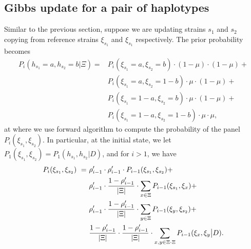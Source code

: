 \subsection{Gibbs update for a pair of haplotypes}
Similar to the previous section, suppose we are updating strains $s_1$ and $s_2$ copying from reference strains $\xi_{s_1}$ and $\xi_{s_1}$ respectively. The prior probability  becomes
\begin{equation}
\begin{split}
P_i \left( h_{s_1} = a, h_{s_2} = b | \Xi \right) = & P_i\left( \xi_{s_1} = a, \xi_{s_2} = b \right) \cdot (1-\mu)\cdot(1-\mu)  + \\
                                                    & P_i\left( \xi_{s_1} = a, \xi_{s_2} = 1-b \right) \cdot  \mu\cdot(1-\mu)  + \\
                                                    & P_i\left( \xi_{s_1} = 1-a, \xi_{s_2} = b \right) \cdot  \mu\cdot(1-\mu)  + \\
                                                    & P_i\left( \xi_{s_1} = 1-a, \xi_{s_2} = 1-b \right) \cdot \mu \cdot \mu,
\end{split}\label{eqn:llk_given_D:two}
\end{equation}
at where we use forward algorithm to compute the probability of the panel $P_i(\xi_{s_1}, \xi_{s_2})$. In particular, at the initial state, we let $P_1(\xi_{s_1}, \xi_{s_2}) = P_1(h_{s_1}, h_{s_2}|D)$, and for $i>1$, we have
\begin{equation}
\begin{split}
P_{i}(\xi_{s_1}, \xi_{s_2}) ~ = ~ &  \rho_{i-1}' \cdot \rho_{i-1}' \cdot P_{i-1}(\xi_{s_1},\xi_{s_2})  + \\
                                  &  \rho_{i-1}' \cdot \frac{1-\rho_{i-1}'}{|\Xi|} \cdot \sum_{x\in \Xi} P_{i-1}(\xi_{s_1},\xi_{x}) + \\
                                  &  \rho_{i-1}' \cdot \frac{1-\rho_{i-1}'}{|\Xi|} \cdot \sum_{y\in \Xi} P_{i-1}(\xi_{y},\xi_{s_2}) + \\
                                  &  \frac{1-\rho_{i-1}'}{|\Xi|} \cdot \frac{1-\rho_{i-1}'}{|\Xi|} \cdot \sum_{x,y\in \Xi\cdot \Xi} P_{i-1}(\xi_{x},\xi_{y}\big{|}D)  . \label{eqn:prio.update.two}
\end{split}
\end{equation}

